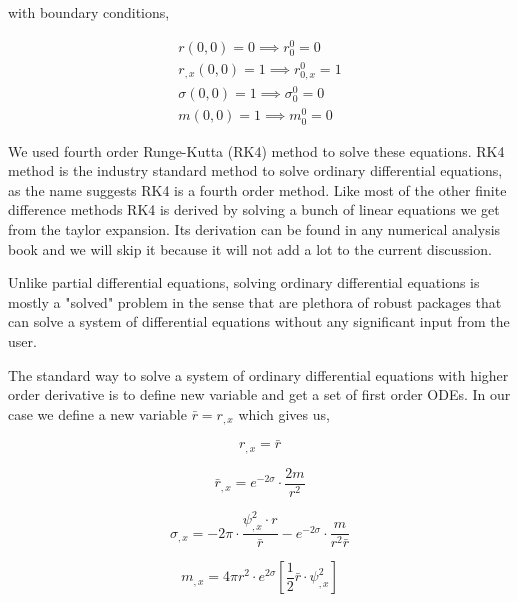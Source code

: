 with boundary conditions,

\begin{eqnarray}
    r(0 ,0) = 0 \implies r^0_0 = 0 \\
    r_{,x}(0 ,0) = 1 \implies r^0_{0,x} = 1 \\
    \sigma(0 ,0) = 1 \implies \sigma^0_0 = 0 \\
    m(0 ,0) = 1 \implies m^0_0 = 0
\end{eqnarray}

We used fourth order Runge-Kutta (RK4) method to solve these equations. RK4 method is the industry standard method to solve ordinary differential equations, as the name suggests RK4 is a fourth order method. Like most of the other finite difference methods RK4 is derived by solving a bunch of linear equations we get from the taylor expansion. Its derivation can be found in any numerical analysis book and we will skip it because it will not add a lot to the current discussion.

Unlike partial differential equations, solving ordinary differential equations is mostly a "solved" problem in the sense that are plethora of robust packages that can solve a system of differential equations without any significant input from the user.

The standard way to solve a system of ordinary differential equations with higher order derivative is to define new variable and get a set of first order ODEs. In our case we define a new variable $\bar r = r_{,x}$ which gives us,


\begin{equation}
    r_{,x} = \bar r
    \label{eqn:r2_ic}
\end{equation}

\begin{equation}
    \bar r_{,x}=e^{-2 \sigma} \cdot \frac{2 m}{r^{2}}
    \label{eqn:br2_ic}
\end{equation}


\begin{equation}
    \sigma_{, x}= -2 \pi \cdot  \frac{\psi_{, x}^{2} \cdot r}{\bar r}- e^{-2 \sigma} \cdot \frac{ m}{r^{2}\bar r}
    \label{eqn:sigma2_ic}
\end{equation}

\begin{equation}
    m_{, x}=4 \pi r^{2} \cdot e^{2 \sigma}\left[\frac{1}{2} \bar r \cdot \psi_{, x}^{2} \right]
    \label{eqn:m2_ic}
\end{equation}

